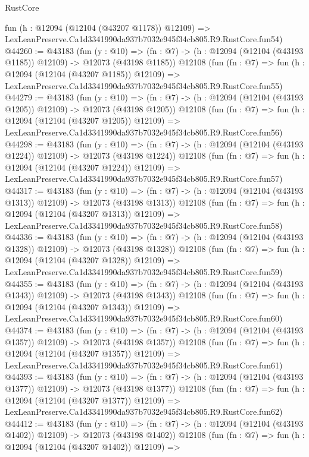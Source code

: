 \begin{lexlean}{RustCore}
\begin{coremodule}
    fun (h : @12094 (@12104 (@43207 @1178)) @12109) =>
    LexLeanPreserve.Ca1d3341990da937b7032e945f34cb805.R9.RustCore.fun54)
@44260 := @43183
    (fun (y : @10) =>
    (fn : @7) -> (h : @12094 (@12104 (@43193 @1185)) @12109) -> @12073 (@43198 @1185))
    @12108
    (fun (fn : @7) =>
    fun (h : @12094 (@12104 (@43207 @1185)) @12109) =>
    LexLeanPreserve.Ca1d3341990da937b7032e945f34cb805.R9.RustCore.fun55)
@44279 := @43183
    (fun (y : @10) =>
    (fn : @7) -> (h : @12094 (@12104 (@43193 @1205)) @12109) -> @12073 (@43198 @1205))
    @12108
    (fun (fn : @7) =>
    fun (h : @12094 (@12104 (@43207 @1205)) @12109) =>
    LexLeanPreserve.Ca1d3341990da937b7032e945f34cb805.R9.RustCore.fun56)
@44298 := @43183
    (fun (y : @10) =>
    (fn : @7) -> (h : @12094 (@12104 (@43193 @1224)) @12109) -> @12073 (@43198 @1224))
    @12108
    (fun (fn : @7) =>
    fun (h : @12094 (@12104 (@43207 @1224)) @12109) =>
    LexLeanPreserve.Ca1d3341990da937b7032e945f34cb805.R9.RustCore.fun57)
@44317 := @43183
    (fun (y : @10) =>
    (fn : @7) -> (h : @12094 (@12104 (@43193 @1313)) @12109) -> @12073 (@43198 @1313))
    @12108
    (fun (fn : @7) =>
    fun (h : @12094 (@12104 (@43207 @1313)) @12109) =>
    LexLeanPreserve.Ca1d3341990da937b7032e945f34cb805.R9.RustCore.fun58)
@44336 := @43183
    (fun (y : @10) =>
    (fn : @7) -> (h : @12094 (@12104 (@43193 @1328)) @12109) -> @12073 (@43198 @1328))
    @12108
    (fun (fn : @7) =>
    fun (h : @12094 (@12104 (@43207 @1328)) @12109) =>
    LexLeanPreserve.Ca1d3341990da937b7032e945f34cb805.R9.RustCore.fun59)
@44355 := @43183
    (fun (y : @10) =>
    (fn : @7) -> (h : @12094 (@12104 (@43193 @1343)) @12109) -> @12073 (@43198 @1343))
    @12108
    (fun (fn : @7) =>
    fun (h : @12094 (@12104 (@43207 @1343)) @12109) =>
    LexLeanPreserve.Ca1d3341990da937b7032e945f34cb805.R9.RustCore.fun60)
@44374 := @43183
    (fun (y : @10) =>
    (fn : @7) -> (h : @12094 (@12104 (@43193 @1357)) @12109) -> @12073 (@43198 @1357))
    @12108
    (fun (fn : @7) =>
    fun (h : @12094 (@12104 (@43207 @1357)) @12109) =>
    LexLeanPreserve.Ca1d3341990da937b7032e945f34cb805.R9.RustCore.fun61)
@44393 := @43183
    (fun (y : @10) =>
    (fn : @7) -> (h : @12094 (@12104 (@43193 @1377)) @12109) -> @12073 (@43198 @1377))
    @12108
    (fun (fn : @7) =>
    fun (h : @12094 (@12104 (@43207 @1377)) @12109) =>
    LexLeanPreserve.Ca1d3341990da937b7032e945f34cb805.R9.RustCore.fun62)
@44412 := @43183
    (fun (y : @10) =>
    (fn : @7) -> (h : @12094 (@12104 (@43193 @1402)) @12109) -> @12073 (@43198 @1402))
    @12108
    (fun (fn : @7) =>
    fun (h : @12094 (@12104 (@43207 @1402)) @12109) =>

\end{coremodule}
\end{lexlean}
